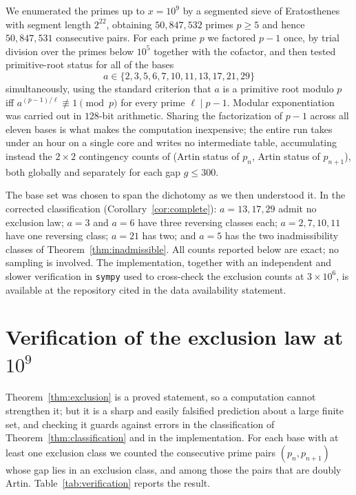 \documentclass[11pt,reqno]{amsart}
\theoremstyle{plain}
\theoremstyle{definition}
\begin{document}
We enumerated the primes up to $x = 10^9$ by a segmented sieve of Eratosthenes
with segment length $2^{22}$, obtaining $50{,}847{,}532$ primes $p \ge 5$ and
hence $50{,}847{,}531$ consecutive pairs. For each prime $p$ we factored
$p - 1$ once, by trial division over the primes below $10^5$ together with the
cofactor, and then tested primitive-root status for all of the bases
\[
  a \in \{2, 3, 5, 6, 7, 10, 11, 13, 17, 21, 29\}
\]
simultaneously, using the standard criterion that $a$ is a primitive root
modulo $p$ iff $a^{(p-1)/\ell} \not\equiv 1 \pmod p$ for every prime
$\ell \mid p-1$. Modular exponentiation was carried out in $128$-bit
arithmetic. Sharing the factorization of $p-1$ across all eleven bases is what
makes the computation inexpensive; the entire run takes under an hour on a
single core and writes no intermediate table, accumulating instead the
$2\times 2$ contingency counts of (Artin status of $p_n$, Artin status of
$p_{n+1}$), both globally and separately for each gap $g \le 300$.

The base set was chosen to span the dichotomy as we then understood it. In
the corrected classification (Corollary~\ref{cor:complete}): $a = 13, 17, 29$
admit no exclusion law; $a = 3$ and $a = 6$ have three reversing classes each;
$a = 2, 7, 10, 11$ have one reversing class; $a = 21$ has two; and $a = 5$ has
the two inadmissibility classes of Theorem~\ref{thm:inadmissible}. All counts
reported below are exact; no sampling is involved. The implementation,
together with an independent and slower verification in \texttt{sympy} used to
cross-check the exclusion counts at $3 \times 10^6$, is available at the
repository cited in the data availability statement.

\section{Verification of the exclusion law at \texorpdfstring{$10^9$}{10^9}}
\label{sec:verification}

Theorem~\ref{thm:exclusion} is a proved statement, so a computation cannot
strengthen it; but it is a sharp and easily falsified prediction about a large
finite set, and checking it guards against errors in the classification of
Theorem~\ref{thm:classification} and in the implementation. For each base with
at least one exclusion class we counted the consecutive prime pairs
$(p_n, p_{n+1})$ whose gap lies in an exclusion class, and among those the pairs
that are doubly Artin. Table~\ref{tab:verification} reports the result.
\end{document}
